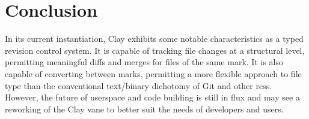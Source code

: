 \documentclass[twoside]{article}
\begin{document}
\section{Conclusion}

In its current instantiation, Clay exhibits some notable characteristics as a typed revision control system.  It is capable of tracking file changes at a structural level, permitting meaningful diffs and merges for files of the same mark.  It is also capable of converting between marks, permitting a more flexible approach to file type than the conventional text/binary dichotomy of Git and other {\sc rcs}s.  However, the future of userspace and code building is still in flux and may see a reworking of the Clay vane to better suit the needs of developers and users.\tombstone{}

\printbibliography
\end{document}
